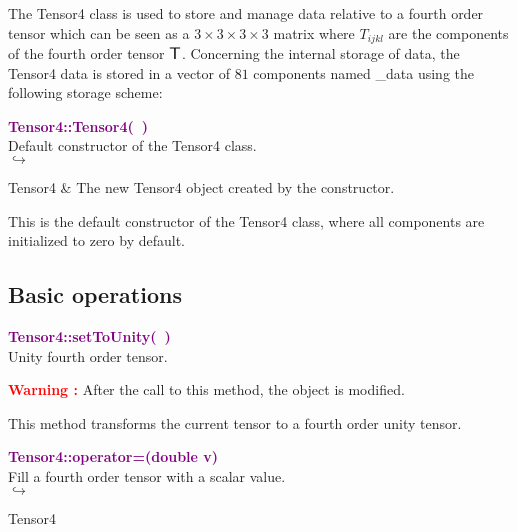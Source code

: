 The Tensor4 class is used to store and manage data relative to a fourth order tensor which can be seen as a $3\times3\times3\times3$ matrix where $T_{ijkl}$ are the components of the fourth order tensor $\mbox{\large\ensuremath{\mathsf{T}}}$.
Concerning the internal storage of data, the Tensor4 data is stored in a vector of $81$ components named \textsf{\_data} using the following storage scheme:



\textcolor{purple}{\textbf{Tensor4::Tensor4(~)}}\label{Tensor4::Tensor4()}\\
Default constructor of the Tensor4 class.\\ \hspace*{5mm}$\hookrightarrow$
\vspace*{-2em}\begin{tcolorbox}[grow to left by=-1cm, width=\textwidth-1cm,myArgs,tabularx={l|R}]
Tensor4 & The new Tensor4 object created by the constructor.
\end{tcolorbox}

This is the default constructor of the Tensor4 class, where all components are initialized to zero by default.

\subsection{Basic operations}

\textcolor{purple}{\textbf{Tensor4::setToUnity(~)}}\label{Tensor4::setToUnity()}\\
Unity fourth order tensor.

\hspace*{10mm}\textcolor{red}{\textbf{Warning :}} After the call to this method, the object is modified.

This method transforms the current tensor to a fourth order unity tensor.

\textcolor{purple}{\textbf{Tensor4::operator=(double v)}}\label{Tensor4::operator=(double v)}\\
Fill a fourth order tensor with a scalar value.\\ \hspace*{5mm}$\hookrightarrow$
\vspace*{-2em}\begin{tcolorbox}[grow to left by=-1cm, width=\textwidth-1cm,myArgs,tabularx={l|R}]
Tensor4
\end{tcolorbox}


